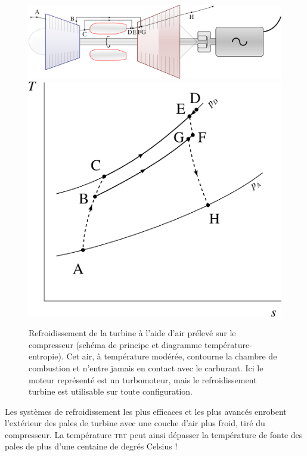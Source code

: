 {{		\begin{figure}
			\begin{center}
				\includegraphics[scale=0.6]{images/circuit_refroidissement_turbine.png}\vspace{0.5cm}
				\includegraphics[scale=0.8]{images/ts_gp_refroidissement_turbine.png}
			\end{center}
			\caption{Refroidissement de la turbine à l’aide d’air prélevé sur le compresseur (schéma de principe et diagramme température-entropie).
			Cet air, à température modérée, contourne la chambre de combustion et n’entre jamais en contact avec le carburant. Ici le moteur représenté est un turbomoteur, mais le refroidissement turbine est utilisable sur toute configuration.}
			\label{fig_refroidissement_turbine}
		\end{figure}


		Les systèmes de refroidissement les plus efficaces et les plus avancés enrobent l’ex\-térieur des pales de turbine avec une couche d’air plus froid, tiré du compresseur. La température \textsc{tet} peut ainsi dépasser la température de fonte des pales de plus d’une centaine de degrés Celsius !

}}
